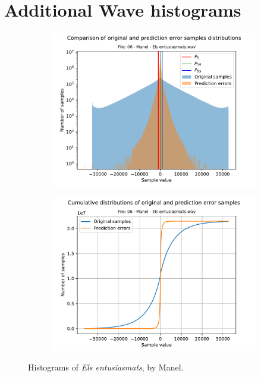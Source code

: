 \chapter{Additional Wave histograms} \label{ch:wave_hists}
\begin{figure}[h!]
	\centering
	\begin{subfigure}{0.45\textwidth}
		\centering
		\includegraphics[width=\linewidth]{images/wave_hists/06 - Manel - Els entusiasmats.wav_hist.pdf}
	\end{subfigure}%
	\begin{subfigure}{0.45\textwidth}
		\centering
		\includegraphics[width=\linewidth]{images/wave_hists/06 - Manel - Els entusiasmats.wav_hist_cum.pdf}
	\end{subfigure}
	\caption{Histograms of \textit{Els entusiasmats}, by Manel.}
	\label{fig:entusiasmats_manel}
\end{figure}

